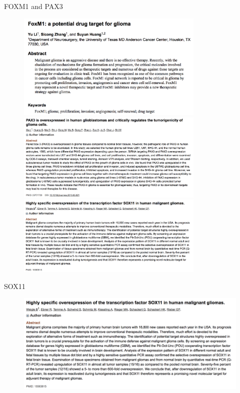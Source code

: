 \documentclass[slidestop,compress,11pt,xcolor=dvipsnames]{beamer}
\begin{document}
\begin{frame}{FOXM1 and PAX3}
\vspace{-0.5cm}
 \begin{figure}[ht!]
  \centering
  \includegraphics[width=0.8\textwidth]{glioma/paper_FOXM1.png}
  \includegraphics[width=0.8\textwidth]{glioma/paper_pax3.png}
  \includegraphics[width=0.8\textwidth]{glioma/paper_SOX11.png}
 \end{figure}
\end{frame}

\begin{frame}{SOX11}
 \begin{figure}[ht!]
  \centering
  \includegraphics[width=1.0\textwidth]{glioma/paper_SOX11.png}
 \end{figure}
\end{frame}
\end{document}
